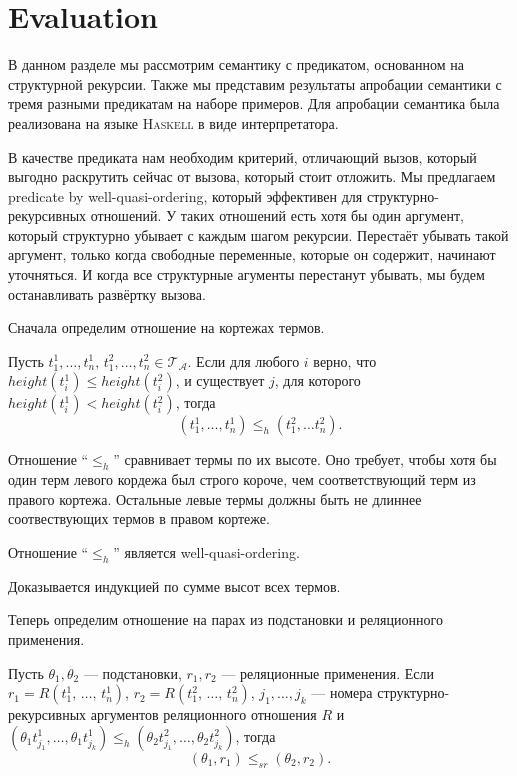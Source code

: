 \section{Evaluation}
\label{sec:eval}

В данном разделе мы рассмотрим семантику с предикатом, основанном на структурной рекурсии. Также мы представим результаты апробации семантики с тремя разными предикатам на наборе примеров. Для апробации семантика была реализована на языке \textsc{Haskell} в виде интерпретатора. 


В качестве предиката нам необходим критерий, отличающий вызов, который выгодно раскрутить сейчас от вызова, который стоит отложить. Мы предлагаем predicate by well-quasi-ordering, который эффективен для структурно-рекурсивных отношений. У таких отношений есть хотя бы один аргумент, который структурно убывает с каждым шагом рекурсии. Перестаёт убывать такой аргумент, только когда свободные переменные, которые он содержит, начинают уточняться. И когда все структурные агументы перестанут убывать, мы будем останавливать развёртку вызова.

Сначала определим отношение на кортежах термов.

\begin{definition}
Пусть $t_1^1, \ldots, t_n^1, \, t_1^2, \ldots, t_n^2 \in \mathcal{T}_{\mathcal A}$. Если для любого $i$ верно, что $height(t_i^1) \leq height(t_i^2)$, и существует $j$, для которого $height(t_i^1) < height(t_i^2)$, тогда 
\[
  (t_1^1, \ldots, t_n^1) \leq_h (t_1^2, \ldots t_n^2).
\]
\end{definition}

Отношение ``$\leq_h$'' сравнивает термы по их высоте. Оно требует, чтобы хотя бы один терм левого кордежа был строго короче, чем соответствующий терм из правого кортежа. Остальные левые термы должны быть не длиннее соотвествующих термов в правом кортеже.

\begin{lemma}
\label{lemma:wqo1}
Отношение ``$\leq_h$'' является well-quasi-ordering.
\end{lemma}
Доказывается индукцией по сумме высот всех термов.

Теперь определим отношение на парах из подстановки и реляционного применения.

\begin{definition}
Пусть $\theta_1, \theta_2$ --- подстановки,  $r_1, r_2$ --- реляционные применения. Если $r_1 = R(t^1_1,\,\ldots,\,t^1_n)$, $r_2 = R(t^2_1,\,\ldots,\,t^2_n)$, $j_1, \ldots, j_k$ --- номера структурно-рекурсивных аргументов реляционного отношения $R$ и $(\theta_1 t^1_{j_1}, \ldots, \theta_1 t^1_{j_k}) \leq_h (\theta_2 t^2_{j_1}, \ldots, \theta_2 t^2_{j_k})$, тогда
\[
  (\theta_1, r_1) \leq_{sr} (\theta_2, r_2).
\]
\end{definition}

